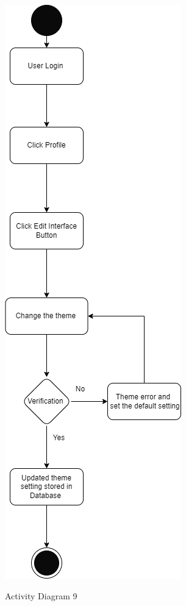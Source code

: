 \begin{figure}[H]
    \centering
    \caption{Activity Diagram 9}
    \includegraphics[scale=0.5]{./diagrams/Activity Diagram/ad-09.png}
    \label{fig:act-09}

\end{figure}


